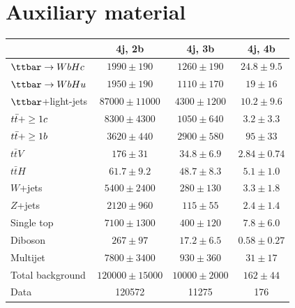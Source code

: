 \part*{Auxiliary material}

\begin{table}[htbp]
\small
\begin{center}
\begin{tabular}{l*{3}{c}}
\hline\hline
 & 4j, 2b & 4j, 3b & 4j, 4b \\
\hline
$\Hc$ & $ 1990 \pm 190 $ &   $ 1260 \pm 190 $ &   $ 24.8 \pm 9.5 $ \\
$\Hu$ & $ 1950 \pm 190 $ &   $ 1110 \pm 170 $ &   $ 19 \pm 16 $ \\ 
\hline
$\ttbar$+light-jets & $ 87000 \pm 11000 $ &   $ 4300 \pm 1200 $ &   $ 10.2 \pm 9.6 $ \\ 
$t\bar{t}+\geq1c$ & $ 8300 \pm 4300 $ &   $ 1050 \pm 640 $ &   $ 3.2 \pm 3.3 $ \\ 
$t\bar{t}+\geq1b$ & $ 3620 \pm 440 $ &   $ 2900 \pm 580 $ &   $ 95 \pm 33 $ \\ 
$t\bar{t}V$ & $ 176 \pm 31 $ &   $ 34.8 \pm 6.9 $ &   $ 2.84 \pm 0.74 $ \\ 
$t\bar{t}H$ & $ 61.7 \pm 9.2 $ &   $ 48.7 \pm 8.3 $ &   $ 5.1 \pm 1.0 $ \\
$W$+jets & $ 5400 \pm 2400 $ &   $ 280 \pm 130 $ &   $ 3.3 \pm 1.8 $ \\ 
$Z$+jets & $ 2120 \pm 960 $ &   $ 115 \pm 55 $ &   $ 2.4 \pm 1.4 $ \\ 
Single top & $ 7100 \pm 1300 $ &   $ 400 \pm 120 $ &   $ 7.8 \pm 6.0 $ \\ 
Diboson & $ 267 \pm 97 $ &   $ 17.2 \pm 6.5 $ &   $ 0.58 \pm 0.27 $ \\ 
Multijet & $ 7800 \pm 3400 $ &   $ 930 \pm 360 $ &   $ 31 \pm 17 $ \\
\hline
Total background & $ 120000 \pm 15000 $ &   $ 10000 \pm 2000 $ &   $ 162 \pm 44 $ \\ 
\hline
Data & 120572  & 11275  & 176  \\
\hline\hline    
\end{tabular}
\vspace{0.2cm}


\end{center}
\end{table}
